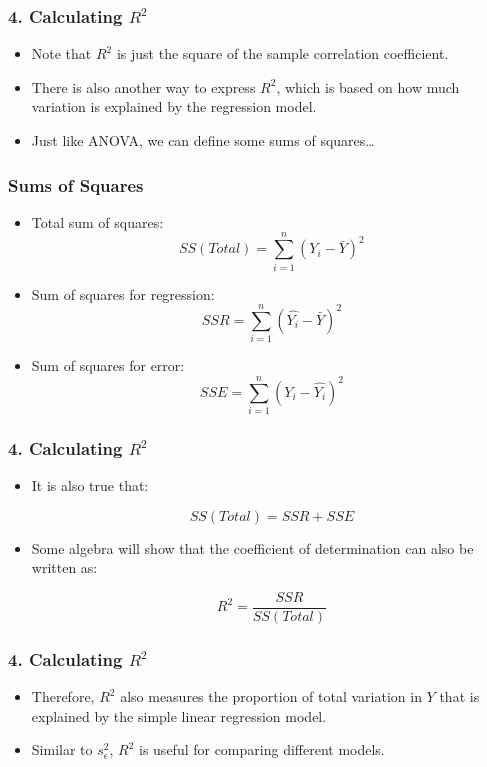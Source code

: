 \documentclass[12pt]{beamer}
\begin{document}
\begin{frame}
	\frametitle{4. Calculating $R^2$}
	
	\begin{itemize}[label={\color{blue}$\blacktriangleright$}]
		\item Note that $R^2$ is just the square of the sample correlation coefficient.
		
		\item There is also another way to express $R^2$, which is based on how much variation is explained by the regression model.
		
		\item Just like ANOVA, we can define some sums of squares\ldots
	\end{itemize}
\end{frame}
\begin{frame}
	\frametitle{Sums of Squares}
	
	\begin{itemize}[label={\color{blue}$\blacktriangleright$}]
		\item Total sum of squares:
		\[
		SS(Total) = \sum_{i=1}^n (Y_i - \bar{Y})^2
		\]
		
		\item Sum of squares for regression:
		\[
		SSR = \sum_{i=1}^n (\hat{Y_i} - \bar{Y})^2
		\]
		
		\item Sum of squares for error:
		\[
		SSE = \sum_{i=1}^n (Y_i - \hat{Y_i})^2
		\]
	\end{itemize}
\end{frame}
\begin{frame}
	\frametitle{4. Calculating $R^2$}
	
	\begin{itemize}[label={\color{blue}$\blacktriangleright$}]
		\item It is also true that:
		
		\[
		SS(Total) = SSR + SSE
		\]
		
		\item Some algebra will show that the coefficient of determination can also be written as:
		
		\[
		R^2 = \frac{SSR}{SS(Total)}
		\]
	\end{itemize}
\end{frame}
\begin{frame}
	\frametitle{4. Calculating $R^2$}
	
	\begin{itemize}[label={\color{blue}$\blacktriangleright$}]
		\item Therefore, $R^2$ also measures the proportion of total variation in $Y$ that is explained by the simple linear regression model.
		
		\item Similar to $s_\epsilon^2$, $R^2$ is useful for comparing different models.
	\end{itemize}
\end{frame}
\end{document}
